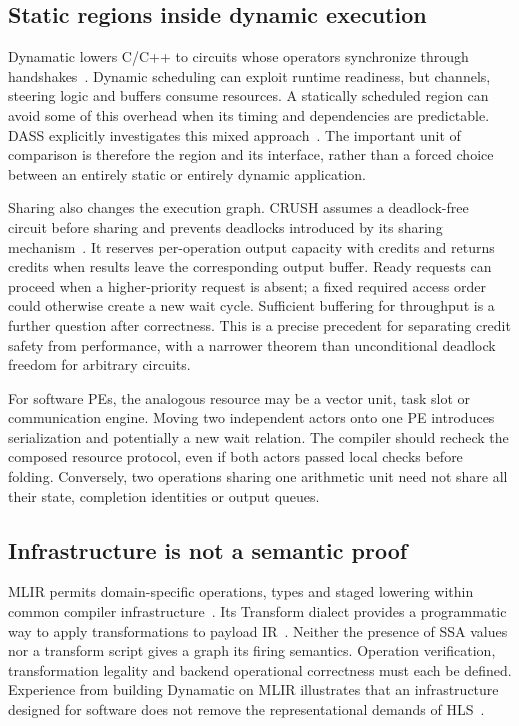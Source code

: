 \documentclass[final,3p,times,authoryear]{elsarticle}
\begin{document}
\subsection{Static regions inside dynamic execution}
Dynamatic lowers C/C++ to circuits whose operators synchronize through handshakes~\citep{josipovic2020}. Dynamic scheduling can exploit runtime readiness, but channels, steering logic and buffers consume resources. A statically scheduled region can avoid some of this overhead when its timing and dependencies are predictable. DASS explicitly investigates this mixed approach~\citep{cheng2021dass}. The important unit of comparison is therefore the region and its interface, rather than a forced choice between an entirely static or entirely dynamic application.

Sharing also changes the execution graph. CRUSH assumes a deadlock-free circuit before sharing and prevents deadlocks introduced by its sharing mechanism~\citep{crush2025}. It reserves per-operation output capacity with credits and returns credits when results leave the corresponding output buffer. Ready requests can proceed when a higher-priority request is absent; a fixed required access order could otherwise create a new wait cycle. Sufficient buffering for throughput is a further question after correctness. This is a precise precedent for separating credit safety from performance, with a narrower theorem than unconditional deadlock freedom for arbitrary circuits.

For software PEs, the analogous resource may be a vector unit, task slot or communication engine. Moving two independent actors onto one PE introduces serialization and potentially a new wait relation. The compiler should recheck the composed resource protocol, even if both actors passed local checks before folding. Conversely, two operations sharing one arithmetic unit need not share all their state, completion identities or output queues.

\subsection{Infrastructure is not a semantic proof}
MLIR permits domain-specific operations, types and staged lowering within common compiler infrastructure~\citep{lattner2021}. Its Transform dialect provides a programmatic way to apply transformations to payload IR~\citep{mlirtransform2026}. Neither the presence of SSA values nor a transform script gives a graph its firing semantics. Operation verification, transformation legality and backend operational correctness must each be defined. Experience from building Dynamatic on MLIR illustrates that an infrastructure designed for software does not remove the representational demands of HLS~\citep{xu2026mlir}.
\end{document}
